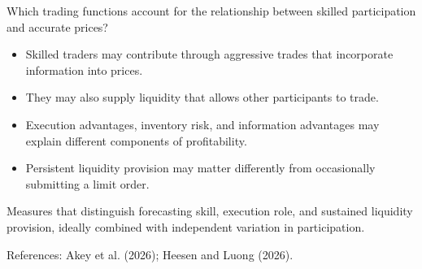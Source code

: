 \begin{frame}[t]
\par{}
\begin{pmbody}
{\color{pmGrey}\fontsize{20}{27}\selectfont Which trading functions account for the relationship between skilled participation and accurate prices?\par}
\begin{itemize}\pmspreaditems
  \item Skilled traders may contribute through aggressive trades that incorporate information into prices.
  \item They may also supply liquidity that allows other participants to trade.
  \item Execution advantages, inventory risk, and information advantages may explain different components of profitability.
  \item Persistent liquidity provision may matter differently from occasionally submitting a limit order.
\end{itemize}
\begin{pmcallout}
  Measures that distinguish forecasting skill, execution role, and sustained liquidity provision, ideally combined with independent variation in participation.
\end{pmcallout}
{\color{pmGrey}\fontsize{11}{14}\selectfont References: Akey et al. (2026); Heesen and Luong (2026).\par}
\end{pmbody}
\end{frame}


